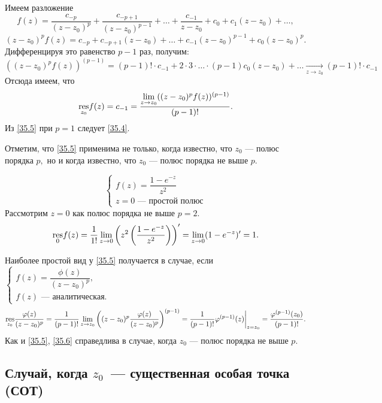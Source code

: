\documentclass[../../main.tex]{subfiles}
\begin{document}
	Имеем разложение 
	\[
		f(z) = \frac{c_{-p}}{(z-z_0)^{p}} + \frac{c_{-p+1}}{(z-z_0)^{p-1}} + \ldots + 
		\frac{c_{-1}}{z-z_0} + c_0 + c_1(z-z_0) + \ldots,
	\]
	\[
		(z-z_0)^pf(z) = c_{-p} + c_{-p+1}(z-z_0) + \ldots + c_{-1}(z-z_0)^{p-1} + 
		c_0(z-z_0)^p.
	\]
	Дифференцируя это равенство $p-1$ раз, получим:
	\[
		((z-z_0)^pf(z))^{(p-1)} = (p-1)!\cdot c_{-1} + 2 \cdot 3 \cdot \ldots \cdot 
		(p-1)c_0(z-z_0) + \ldots 
		\underset{z \to z_0}{\to} (p-1)!\cdot c_{-1}
	\]
	Отсюда имеем, что
	\begin{equation} \label{35.5}
		\underset{z_0}{\operatorname{res}} f(z) = c_{-1} = \frac{
		\lim\limits_{z\to z_0} ((z-z_0)^pf(z))^{(p-1)} }{(p-1)!}.
	\end{equation}
	Из \eqref{35.5} при $p=1$ следует \eqref{35.4}.
	
	Отметим, что \eqref{35.5} применима не только, когда известно, что $z_0$ --- 
	полюс порядка $p,$ но и когда известно, что $z_0$ --- полюс порядка не выше 
	$p.$
	
	\begin{example}
		\[
			\begin{cases}
				f(z) = \dfrac{1-e^{-z}}{z^2} \\
				z = 0 \text{ --- простой полюс}
			\end{cases}
		\]
		Рассмотрим $z = 0$ как полюс порядка не выше $p=2.$
		\[
			\underset{0}{\operatorname{res}}f(z) = \dfrac{1}{1!}\lim_{z\to 
			0}\left(z^2\left(\dfrac{1-e^{-z}}{z^2}\right)\right)' = 
			\lim_{z\to 0} (1 - e^{-z})' = 1.
		\]
	\end{example}
	
	\medskip
	
	Наиболее простой вид у \eqref{35.5} получается в случае, если $\begin{cases}
	f(z)  = \dfrac{\phi(z)}{(z-z_0)^p}, \\
	f(z) \text{ --- аналитическая.}
	\end{cases}$
	\begin{equation} \label{35.6}
		\underset{z_0}{\operatorname{res}}  \frac{\varphi(z)}{(z-z_0)^p} = \frac{1}{(p-1)!}
		 \lim\limits_{z\to z_0} \left((z-z_0)^p 
		 \frac{\varphi(z)}{(z-z_0)^p}\right)^{(p-1)} = 
		 \frac{1}{(p-1)!} \varphi^{(p-1)}(z)\bigg|_{z = z_0} = 
		 \frac{\varphi^{(p-1)}(z_0)}{(p-1)!}.
	\end{equation}
	Как и \eqref{35.5}, \eqref{35.6} справедлива в случае, когда $z_0$ --- полюс 
	порядка не выше $p$.
	
	\subsection{Случай, когда $z_0$~--- существенная особая точка (СОТ)}
	
\end{document}
